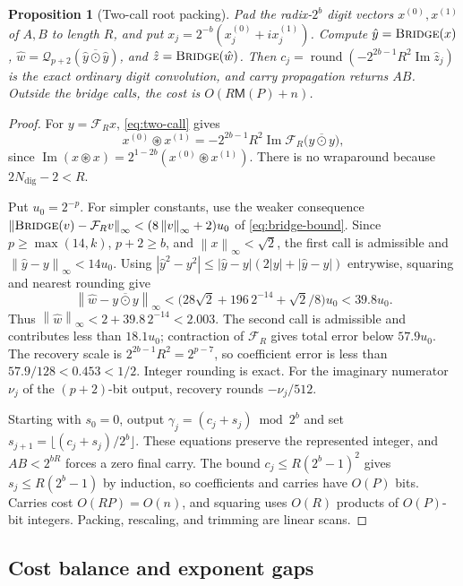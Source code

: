 \documentclass[11pt]{article}
\newtheorem{proposition}[theorem]{Proposition}
\theoremstyle{definition}
\renewcommand{\label}[1]{}%
\newcommand{\cF}{\mathcal{F}}
\newcommand{\Quant}{\mathcal{Q}}
\newcommand{\norm}[1]{\left\lVert #1 \right\rVert}
\newcommand{\Bridge}{\textnormal{\textsc{Bridge}}}
\begin{document}
\begin{proposition}[Two-call root packing]\label{prop:root-packing}
Pad the radix-$2^b$ digit vectors $x^{(0)},x^{(1)}$ of $A,B$ to length $R$,
and put $x_j=2^{-b}(x_j^{(0)}+ix_j^{(1)})$.
Compute $\hat y=\Bridge(x)$,
$\hat w=\Quant_{p+2}(\overline{\hat y\odot\hat y})$, and
$\hat z=\Bridge(\hat w)$.
Then $c_j=\operatorname{round}(-2^{2b-1}R^2\operatorname{Im}\hat z_j)$
is the exact ordinary digit convolution, and carry propagation returns $AB$.
Outside the bridge calls, the cost is $O(R\mathsf M(P)+n)$.
\end{proposition}
\begin{proof}
For $y=\cF_Rx$, \eqref{eq:two-call} gives
\[
 x^{(0)}\circledast x^{(1)}
 =-2^{2b-1}R^2\operatorname{Im}
       \cF_R\bigl(\overline{y\odot y}\bigr),
\]
since $\operatorname{Im}(x\circledast x)
=2^{1-2b}(x^{(0)}\circledast x^{(1)})$.
There is no wraparound because $2N_{\mathrm{dig}}-2<R$.

Put $u_0=2^{-p}$.
For simpler constants, use the weaker consequence
$\norm{\Bridge(v)-\cF_Rv}_\infty<(8\norm{v}_\infty+2)u_0$
of \eqref{eq:bridge-bound}.
Since $p\ge\max(14,k)$, $p+2\ge b$, and $\norm{x}_\infty<\sqrt2$,
the first call is admissible and $\norm{\hat y-y}_\infty<14u_0$.
Using $|\hat y^2-y^2|\le|\hat y-y|(2|y|+|\hat y-y|)$ entrywise, squaring and nearest rounding give
\[
 \norm{\hat w-\overline{y\odot y}}_\infty
 <\bigl(28\sqrt2+196\,2^{-14}+\sqrt2/8\bigr)u_0<39.8u_0.
\]
Thus $\norm{\hat w}_\infty<2+39.8\,2^{-14}<2.003$.
The second call is admissible and contributes less than $18.1u_0$;
contraction of $\cF_R$ gives total error below $57.9u_0$.
The recovery scale is $2^{2b-1}R^2=2^{p-7}$, so coefficient error is
less than $57.9/128<0.453<1/2$.
Integer rounding is exact.
For the imaginary numerator $\nu_j$ of the $(p+2)$-bit output, recovery rounds $-\nu_j/512$.

Starting with $s_0=0$, output $\gamma_j=(c_j+s_j)\bmod2^b$ and set
$s_{j+1}=\lfloor(c_j+s_j)/2^b\rfloor$.
These equations preserve the represented integer, and $AB<2^{bR}$ forces a zero final carry.
The bound $c_j\le R(2^b-1)^2$ gives $s_j\le R(2^b-1)$ by induction,
so coefficients and carries have $O(P)$ bits.
Carries cost $O(RP)=O(n)$, and squaring uses $O(R)$ products of $O(P)$-bit integers.
Packing, rescaling, and trimming are linear scans.
\end{proof}

\subsection{Cost balance and exponent gaps}\label{sec:mult-cost}
\end{document}
